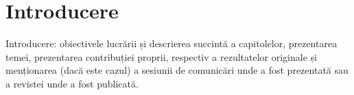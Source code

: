 \chapter{Introducere}

\label{intro}

\par Introducere: obiectivele lucrării și descrierea succintă a capitolelor, prezentarea
temei, prezentarea contribuției proprii, respectiv a rezultatelor originale și
menționarea (dacă este cazul) a sesiunii de comunicări unde a fost prezentată sau a
revistei unde a fost publicată.
